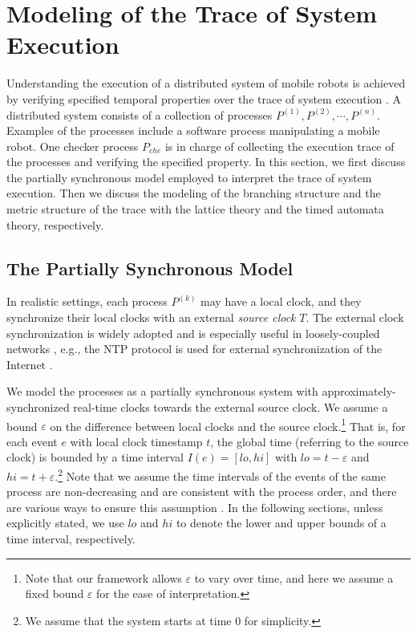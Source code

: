 \documentclass[10pt,conference,compsocconf,letterpaper]{IEEEtran}
\begin{document}
\section{Modeling of the Trace of System Execution} \label{sec:Modeling}

Understanding the execution of a distributed system of mobile robots is achieved by verifying specified temporal properties over the trace of system execution \cite{Cooper91}. A distributed system consists of a collection of processes $P^{(1)}, P^{(2)},\cdots, P^{(n)}$. Examples of the processes include a software process manipulating a mobile robot. One checker process $P_{che}$ is in charge of collecting the execution trace of the processes and verifying the specified property. In this section, we first discuss the partially synchronous model employed to interpret the trace of system execution. Then we discuss the modeling of the branching structure and the metric structure of the trace with the lattice theory and the timed automata theory, respectively.

\subsection{The Partially Synchronous Model} \label{sec:system model}

In realistic settings, each process $P^{(k)}$ may have a local clock, and they synchronize their local clocks with an external \textit{source clock} $T$. The external clock synchronization is widely adopted and is especially useful in loosely-coupled networks \cite{Patt94}, e.g., the NTP protocol is used for external synchronization of the Internet \cite{Mills91}.

We model the processes as a partially synchronous system with approximately-synchronized real-time clocks towards the external source clock. We assume a bound $\varepsilon$ on the difference between local clocks and the source clock.\footnote{Note that our framework allows $\varepsilon$ to vary over time, and here we assume a fixed bound $\varepsilon$ for the ease of interpretation.} That is, for each event $e$ with local clock timestamp $t$, the global time (referring to the source clock) is bounded by a time interval $I(e) = [lo,hi]$ with $lo = t - \varepsilon$ and $hi = t + \varepsilon$.\footnote{We assume that the system starts at time 0 for simplicity.} Note that we assume the time intervals of the events of the same process are non-decreasing and are consistent with the process order, and there are various ways to ensure this assumption \cite{Stoller00}. In the following sections, unless explicitly stated, we use $lo$ and $hi$ to denote the lower and upper bounds of a time interval, respectively.
\end{document}
